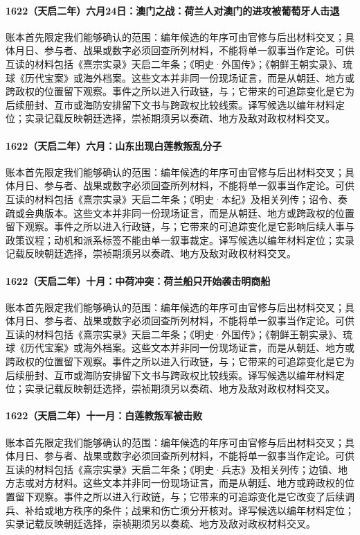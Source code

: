 \paragraph{1622（天启二年）六月24日：澳门之战：荷兰人对澳门的进攻被葡萄牙人击退} 账本首先限定我们能够确认的范围：编年候选的年序可由官修与后出材料交叉；具体月日、参与者、战果或数字必须回查所列材料，不能将单一叙事当作定论。可供互读的材料包括《熹宗实录》天启二年条；《明史·外国传》；《朝鲜王朝实录》、琉球《历代宝案》或海外档案。这些文本并非同一份现场证言，而是从朝廷、地方或跨政权的位置留下观察。事件之所以进入行政链，与；它带来的可追踪变化是它为后续册封、互市或海防安排留下文书与跨政权比较线索。译写候选以编年材料定位；实录记载反映朝廷选择，崇祯期须另以奏疏、地方及敌对政权材料交叉。

\paragraph{1622（天启二年）六月：山东出现白莲教叛乱分子} 账本首先限定我们能够确认的范围：编年候选的年序可由官修与后出材料交叉；具体月日、参与者、战果或数字必须回查所列材料，不能将单一叙事当作定论。可供互读的材料包括《熹宗实录》天启二年条；《明史·本纪》及相关列传；诏令、奏疏或会典版本。这些文本并非同一份现场证言，而是从朝廷、地方或跨政权的位置留下观察。事件之所以进入行政链，与；它带来的可追踪变化是它影响后续人事与政策议程；动机和派系标签不能由单一叙事裁定。译写候选以编年材料定位；实录记载反映朝廷选择，崇祯期须另以奏疏、地方及敌对政权材料交叉。

\paragraph{1622（天启二年）十月：中荷冲突：荷兰船只开始袭击明商船} 账本首先限定我们能够确认的范围：编年候选的年序可由官修与后出材料交叉；具体月日、参与者、战果或数字必须回查所列材料，不能将单一叙事当作定论。可供互读的材料包括《熹宗实录》天启二年条；《明史·外国传》；《朝鲜王朝实录》、琉球《历代宝案》或海外档案。这些文本并非同一份现场证言，而是从朝廷、地方或跨政权的位置留下观察。事件之所以进入行政链，与；它带来的可追踪变化是它为后续册封、互市或海防安排留下文书与跨政权比较线索。译写候选以编年材料定位；实录记载反映朝廷选择，崇祯期须另以奏疏、地方及敌对政权材料交叉。

\paragraph{1622（天启二年）十一月：白莲教叛军被击败} 账本首先限定我们能够确认的范围：编年候选的年序可由官修与后出材料交叉；具体月日、参与者、战果或数字必须回查所列材料，不能将单一叙事当作定论。可供互读的材料包括《熹宗实录》天启二年条；《明史·兵志》及相关列传；边镇、地方志或对方材料。这些文本并非同一份现场证言，而是从朝廷、地方或跨政权的位置留下观察。事件之所以进入行政链，与；它带来的可追踪变化是它改变了后续调兵、补给或地方秩序的条件；战果和伤亡须分开核对。译写候选以编年材料定位；实录记载反映朝廷选择，崇祯期须另以奏疏、地方及敌对政权材料交叉。

